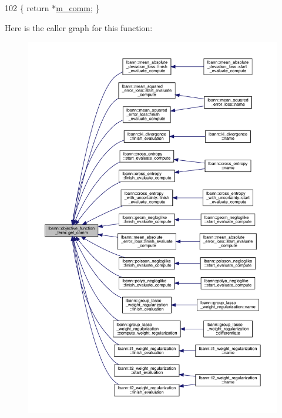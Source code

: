 \begin{DoxyCode}
102 \{ \textcolor{keywordflow}{return} *\hyperlink{classlbann_1_1objective__function__term_a591367c1f2eac887c0f7426335265345}{m\_comm}; \}
\end{DoxyCode}
Here is the caller graph for this function\+:\nopagebreak
\begin{figure}[H]
\begin{center}
\leavevmode
\includegraphics[width=350pt]{classlbann_1_1objective__function__term_a5f89b676a26a6b76ddc26563ac87beb9_icgraph}
\end{center}
\end{figure}
\mbox{\label{classlbann_1_1objective__function__term_aeeb85314738bec6e15877f68b3d422a0}} 
